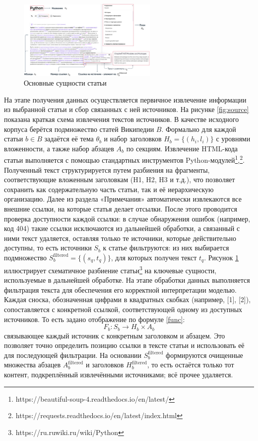 \documentclass{article}
\theoremstyle{definition}
\theoremstyle{plain}
\begin{document}
\begin{figure}[ht!]
  \centering
  \includegraphics[width=0.6\textwidth]{figures/article_entities.png}%
  \caption{Основные сущности статьи}
  \label{fig:article}
\end{figure}

На этапе получения данных осуществляется первичное извлечение информации из выбранной статьи и сбор связанных с ней источников. На рисунке \ref{fig:source} показана краткая схема извлечения текстов источников.
В качестве исходного корпуса берётся подмножество статей Википедии \(B\).
Формально для каждой статьи \(b\in B\) задаётся её тема \(\theta_b\) и набор заголовков \(H_b=\{(h_i,l_i)\}\) с уровнями вложенности, а также набор абзацев \(A_b\) по секциям.
Извлечение HTML-кода статьи выполняется с помощью стандартных инструментов Python-модулей\footnote{https://beautiful-soup-4.readthedocs.io/en/latest/},\footnote{https://requests.readthedocs.io/en/latest/index.html}. 
Полученный текст структурируется путем разбиения на фрагменты, соответствующие вложенным заголовкам (H1, H2, H3 и т.д.), что позволяет сохранить как содержательную часть статьи, так и её иерархическую организацию. 
Далее из раздела «Примечания» автоматически извлекаются все внешние ссылки, на которые статья делает отсылки. После этого проводится проверка доступности каждой ссылки: в случае обнаружения ошибок 
(например, код 404) такие ссылки исключаются из дальнейшей обработки, а связанный с ними текст удаляется, оставляя только те источники, которые действительно доступны,
то есть источники \(S_b\) к статье фильтруются: из них выбирается подмножество \(S_b^{\mathrm{filtered}}=\{(s_q,t_q)\}\), для которых получен текст \(t_q\). 
Рисунок \ref{fig:article} иллюстрирует схематичное разбиение статьи\footnote{https://ru.ruwiki.ru/wiki/Python} на ключевые сущности, используемые в дальнейшей обработке.
На этапе обработки данных выполняется фильтрация текста для обеспечения его корректной интерпретации моделью. 
Каждая сноска, обозначенная цифрами в квадратных скобках (например, [1], [2]), сопоставляется с конкретной ссылкой, соответствующей одному из доступных источников. 
То есть задано отображение по формуле \eqref{func}:
\begin{equation}\label{func}
  F_b: S_b \to H_b \times A_b
\end{equation}
связывающее каждый источник с конкретным заголовком и абзацем.
Это позволяет точно определить позицию ссылки в тексте статьи и использовать её для последующей фильтрации. 
На основании \(S_b^{\mathrm{filtered}}\) формируются очищенные множества абзацев \(A_b^{\mathrm{filtered}}\) и заголовков \(H_b^{\mathrm{filtered}}\), 
то есть остаётся только тот контент, подкреплённый извлечёнными источниками; всё прочее удаляется. 
\end{document}
